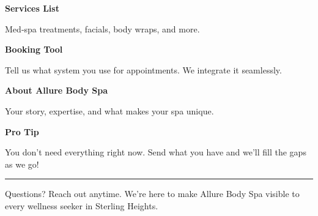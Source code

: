 \documentclass[11pt,letterpaper]{article}
\begin{document}
\begin{minipage}[t]{0.48\textwidth}
\begin{tcolorbox}[colframe=accent-teal, boxrule=1pt, left=0.7em, right=0.7em, top=0.5em, bottom=0.5em, arc=4pt, boxsep=0pt]
{\bfseries\small\color{accent-teal}Services List}

\vspace{0.15em}

{\small Med‑spa treatments, facials, body wraps, and more.}
\end{tcolorbox}

\vspace{0.1em}

\begin{tcolorbox}[colframe=accent-teal, boxrule=1pt, left=0.7em, right=0.7em, top=0.5em, bottom=0.5em, arc=4pt, boxsep=0pt]
{\bfseries\small\color{accent-teal}Booking Tool}

\vspace{0.15em}

{\small Tell us what system you use for appointments. We integrate it seamlessly.}
\end{tcolorbox}

\vspace{0.1em}

\begin{tcolorbox}[colframe=accent-teal, boxrule=1pt, left=0.7em, right=0.7em, top=0.5em, bottom=0.5em, arc=4pt, boxsep=0pt]
{\bfseries\small\color{accent-teal}About Allure Body Spa}

\vspace{0.15em}

{\small Your story, expertise, and what makes your spa unique.}
\end{tcolorbox}

\vspace{-0.2em}
\end{minipage}

\vspace{0.15em}

\begin{tcolorbox}[colback={accent-red!5}, colframe=accent-red!20, boxrule=0.5pt, left=0.7em, right=0.7em, top=0.4em, bottom=0.4em, arc=6pt, boxsep=0pt]

{\bfseries\small\color{accent-red}Pro Tip}

\vspace{0.1em}

{\small You don't need everything right now. Send what you have and we'll fill the gaps as we go!}

\end{tcolorbox}

\vspace{0.15em}

\noindent\hrule
\vspace{0.2em}

{\small\color{text-light}Questions? Reach out anytime. We're here to make Allure Body Spa visible to every wellness seeker in Sterling Heights.}
\end{document}
